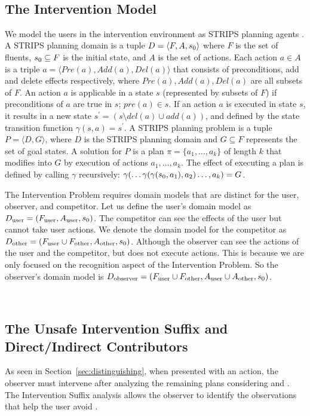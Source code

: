 ~\subsection{The Intervention Model}
\label{sec:models}
We model the users in the intervention environment as STRIPS planning agents \cite{fikes1971strips}.
A STRIPS planning domain is a tuple $D=\langle F, A, s_0\rangle$
where $F$ is the set of fluents, $s_0\subseteq F$ is the initial state, and $A$ is the set of actions.
Each action $a \in A$ is a triple $a=\langle Pre(a), Add(a), Del(a)\rangle$ that consists of preconditions, add and delete effects respectively, where $Pre(a), Add(a), Del(a)$ are all subsets of $F$. 
An action $a$ is applicable in a state $s$ (represented by subsets of $F$) if preconditions of $a$ are true in $s$; $pre(a) \in s$. 
If an action $a$ is executed in state $s$, it results in a new state $s^{\prime} = (s \setminus del(a) \cup add(a))$, and defined by the state transition function $\gamma(s,a)=s^\prime$.
A STRIPS planning problem  is a tuple $ P = \langle D, G \rangle$, where $D$ is the STRIPS planning domain and $G  \subseteq F$ represents the set of goal states. 
A solution for $P$ is a plan $\pi = \{a_1, \dots ,a_k\}$ of length $k$ that modifies \initialState into $G$ by execution of actions $a_1, \dots, a_k$. The effect of executing a plan is defined by calling $\gamma$ recursively: $\gamma(\ldots\gamma(\gamma(s_0,a_1),a_2)\ldots , a_k) = G$.

The Intervention Problem requires domain models that are distinct for the user, observer, and competitor.
Let us define the user's domain model as $D_{\textnormal{user}} = (F_{\textnormal{user}}, A_{\textnormal{user}}, s_0)$.
The competitor can see the effects of the user but cannot take user actions.  
We denote the domain model for the competitor as $D_{\textnormal{other}} = (F_{\textnormal{user}} \cup F_{\textnormal{other}}, A_{\textnormal{other}}, s_0)$.
Although the observer can see the actions of the user and the competitor, but does not execute actions.
This is because we are only focused on the recognition aspect of the Intervention Problem.
So the observer's domain model is $D_{\textnormal{observer}} = (F_{\textnormal{user}} \cup F_{\textnormal{other}}, A_{\textnormal{user}} \cup A_{\textnormal{other}}, s_0)$.

~\subsection{The Unsafe Intervention Suffix and Direct/Indirect Contributors}
\label{sec:suffix}
As seen in Section~\ref{sec:distinguishing}, when presented with an action, 
the observer must intervene after analyzing the remaining plans considering \undesired and \dandu. 
The Intervention Suffix analysis allows the observer to identify the observations that help the user avoid \undesired. 

